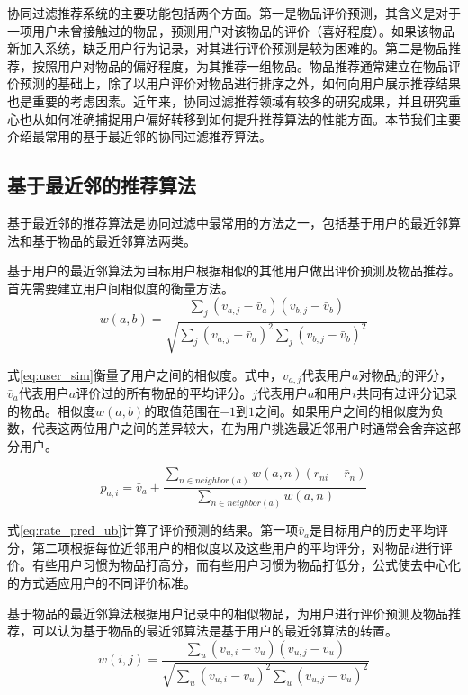 协同过滤推荐系统的主要功能包括两个方面。第一是物品评价预测，其含义是对于一项用户未曾接触过的物品，预测用户对该物品的评价（喜好程度）。如果该物品新加入系统，缺乏用户行为记录，对其进行评价预测是较为困难的。第二是物品推荐，按照用户对物品的偏好程度，为其推荐一组物品。物品推荐通常建立在物品评价预测的基础上，除了以用户评价对物品进行排序之外，如何向用户展示推荐结果也是重要的考虑因素。近年来，协同过滤推荐领域有较多的研究成果，并且研究重心也从如何准确捕捉用户偏好转移到如何提升推荐算法的性能方面。本节我们主要介绍最常用的基于最近邻的协同过滤推荐算法。


\subsection{基于最近邻的推荐算法}
基于最近邻的推荐算法是协同过滤中最常用的方法之一，包括基于用户的最近邻算法和基于物品的最近邻算法两类。

基于用户的最近邻算法为目标用户根据相似的其他用户做出评价预测及物品推荐。首先需要建立用户间相似度的衡量方法\cite{breese1998empirical}。
\begin{equation}
\label{eq:user_sim}
	w(a,b) = \frac{\sum_j(v_{a,j}-\bar{v}_a)(v_{b,j}-\bar{v}_b)}{\sqrt{\sum_j(v_{a,j}-\bar{v}_a)^2\sum_j(v_{b,j}-\bar{v}_b)^2}}
\end{equation}

式\ref{eq:user_sim}衡量了用户之间的相似度。式中，$v_{a,j}$代表用户$a$对物品$j$的评分，$\bar{v}_a$代表用户$a$评价过的所有物品的平均评分。$j$代表用户$a$和用户$i$共同有过评分记录的物品。相似度$w(a,b)$的取值范围在$-1$到$1$之间。如果用户之间的相似度为负数，代表这两位用户之间的差异较大，在为用户挑选最近邻用户时通常会舍弃这部分用户。

\begin{equation}
\label{eq:rate_pred_ub}
	p_{a,i} = \bar{v}_a + \frac{\sum_{n \in neighbor(a)}w(a,n)(r_{ni} - \bar{r}_n)}{\sum_{n \in neighbor(a)}w(a,n)}
\end{equation}

式\ref{eq:rate_pred_ub}计算了评价预测的结果。第一项$\bar{v}_a$是目标用户的历史平均评分，第二项根据每位近邻用户的相似度以及这些用户的平均评分，对物品$i$进行评价。有些用户习惯为物品打高分，而有些用户习惯为物品打低分，公式使去中心化的方式适应用户的不同评价标准。

基于物品的最近邻算法根据用户记录中的相似物品，为用户进行评价预测及物品推荐\cite{sarwar2001item}，可以认为基于物品的最近邻算法是基于用户的最近邻算法的转置。
\begin{equation}
\label{eq:item_sim}
	w(i,j) = \frac{\sum_u(v_{u,i}-\bar{v}_u)(v_{u,j}-\bar{v}_u)}{\sqrt{\sum_u(v_{u,i}-\bar{v}_u)^2\sum_u(v_{u,j}-\bar{v}_u)^2}}
\end{equation}

